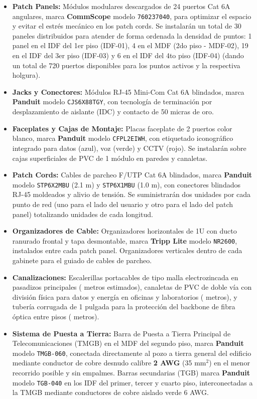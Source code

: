 \begin{itemize}
    \item \textbf{Patch Panels:} Módulos modulares descargados de 24 puertos Cat 6A angulares, marca \textbf{CommScope} modelo \texttt{760237040}, para optimizar el espacio y evitar el estrés mecánico en los patch cords. Se instalarán un total de 30 paneles distribuidos para atender de forma ordenada la densidad de puntos: 1 panel en el IDF del 1er piso (IDF-01), 4 en el MDF (2do piso - MDF-02), 19 en el IDF del 3er piso (IDF-03) y 6 en el IDF del 4to piso (IDF-04) (dando un total de 720 puertos disponibles para los \totalPuntos{} puntos activos y la respectiva holgura).
    \item \textbf{Jacks y Conectores:} Módulos RJ-45 Mini-Com Cat 6A blindados, marca \textbf{Panduit} modelo \texttt{CJS6X88TGY}, con tecnología de terminación por desplazamiento de aislante (IDC) y contacto de 50 micras de oro.
    \item \textbf{Faceplates y Cajas de Montaje:} Placas faceplate de 2 puertos color blanco, marca \textbf{Panduit} modelo \texttt{CFPL2EIWH}, con etiquetado iconográfico integrado para datos (azul), voz (verde) y CCTV (rojo). Se instalarán sobre cajas superficiales de PVC de 1 módulo en paredes y canaletas.
    \item \textbf{Patch Cords:} Cables de parcheo F/UTP Cat 6A blindados, marca \textbf{Panduit} modelo \texttt{STP6X2MBU} (2.1 m) y \texttt{STP6X1MBU} (1.0 m), con conectores blindados RJ-45 moldeados y alivio de tensión. Se suministrarán dos unidades por cada punto de red (uno para el lado del usuario y otro para el lado del patch panel) totalizando \totalPuntos{} unidades de cada longitud.
    \item \textbf{Organizadores de Cable:} Organizadores horizontales de 1U con ducto ranurado frontal y tapa desmontable, marca \textbf{Tripp Lite} modelo \texttt{NR2600}, instalados entre cada patch panel. Organizadores verticales dentro de cada gabinete para el guiado de cables de parcheo.
    \item \textbf{Canalizaciones:} Escalerillas portacables de tipo malla electrozincada en pasadizos principales (\metrosEscalerilla{} metros estimados), canaletas de PVC de doble vía con división física para datos y energía en oficinas y laboratorios (\metrosCanaleta{} metros), y tubería corrugada de 1 pulgada para la protección del backbone de fibra óptica entre pisos (\metrosTuboConduit{} metros).
    \item \textbf{Sistema de Puesta a Tierra:} Barra de Puesta a Tierra Principal de Telecomunicaciones (TMGB) en el MDF del segundo piso, marca \textbf{Panduit} modelo \texttt{TMGB-060}, conectada directamente al pozo a tierra general del edificio mediante conductor de cobre desnudo calibre \textbf{2 AWG} (35 mm$^2$) en el menor recorrido posible y sin empalmes. Barras secundarias (TGB) marca \textbf{Panduit} modelo \texttt{TGB-040} en los IDF del primer, tercer y cuarto piso, interconectadas a la TMGB mediante conductores de cobre aislado verde 6 AWG.
\end{itemize}

